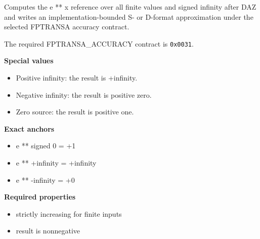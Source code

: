 Computes the e ** x reference over all finite values and signed infinity after DAZ and writes an implementation-bounded S- or D-format approximation under the selected FPTRANSA accuracy contract.

The required FPTRANSA\_ACCURACY contract is \texttt{0x0031}.

\textbf{Special values}\par
\begin{itemize}
\item Positive infinity: the result is +infinity.
\item Negative infinity: the result is positive zero.
\item Zero source: the result is positive one.
\end{itemize}

\textbf{Exact anchors}\par
\begin{itemize}
\item e ** signed 0 = +1
\item e ** +infinity = +infinity
\item e ** -infinity = +0
\end{itemize}

\textbf{Required properties}\par
\begin{itemize}
\item strictly increasing for finite inputs
\item result is nonnegative
\end{itemize}
